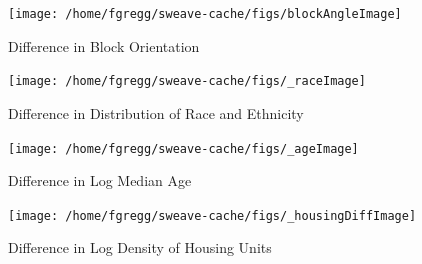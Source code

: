 \documentclass[12pt,letter]{article}\usepackage[]{graphicx}\usepackage[]{color}
\newenvironment{knitrout}{}{} %
\begin{document}
\begin{figure}
\begin{knitrout}
\color{fgcolor}

{\centering \texttt{[image: /home/fgregg/sweave-cache/figs/blockAngleImage]} 

}



\end{knitrout}

\caption{Difference in Block Orientation}
\end{figure}

\begin{figure}
\begin{knitrout}
\color{fgcolor}

{\centering \texttt{[image: /home/fgregg/sweave-cache/figs/\_raceImage]} 

}



\end{knitrout}

\caption{Difference in Distribution of Race and Ethnicity}
\end{figure}


\begin{figure}
\begin{knitrout}
\color{fgcolor}

{\centering \texttt{[image: /home/fgregg/sweave-cache/figs/\_ageImage]} 

}



\end{knitrout}

\caption{Difference in Log Median Age}
\end{figure}


\begin{figure}
\begin{knitrout}
\color{fgcolor}

{\centering \texttt{[image: /home/fgregg/sweave-cache/figs/\_housingDiffImage]} 

}



\end{knitrout}

\caption{Difference in Log Density of Housing Units}
\end{figure}
\end{document}
